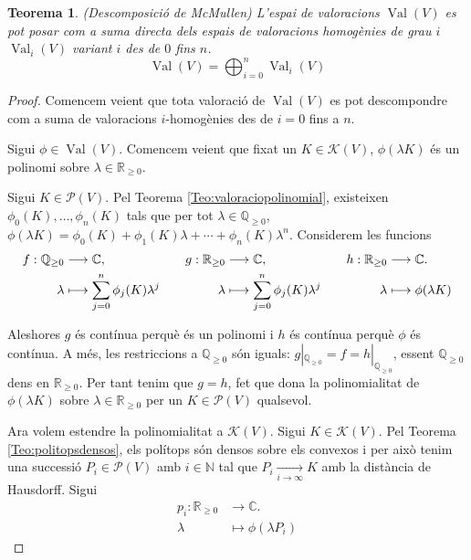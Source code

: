 \documentclass{article}
\newtheorem{teorema}{Teorema}
\theoremstyle{definition}
\DeclareMathOperator{\Val}{Val}
\begin{document}
\begin{teorema}
(Descomposici\'{o} de McMullen) L'espai de valoracions $\Val(V)$ es pot posar com a suma directa dels espais de valoracions homog\`{e}nies de grau $i$ $\Val_i(V)$ variant $i$ des de $0$ fins $n$.
\[\Val(V)=\bigoplus_{i=0}^n\Val_i(V)\]
\end{teorema}
\begin{proof}

Comencem veient que tota valoraci\'{o} de $\Val(V)$ es pot descompondre com a suma de valoracions $i$-homog\`{e}nies des de $i=0$ fins a $n$.

Sigui $\phi\in\Val(V)$. Comencem veient que fixat un $K\in\mathcal{K}(V)$, $\phi(\lambda K)$ \'{e}s un polinomi sobre $\lambda\in\mathbb{R}_{\geq0}$.

Sigui $K\in\mathcal{P}(V)$. Pel Teorema \ref{Teo:valoraciopolinomial}, existeixen $\phi_0(K),\ldots,\phi_n(K)$ tals que per tot $\lambda\in\mathbb{Q}_{\geq0}$, $\phi(\lambda K)=\phi_0(K)+\phi_1(K)\lambda+\cdots+\phi_n(K)\lambda^n$. Considerem les funcions
\[
\begin{split}
f:\mathbb{Q}_{\geq0}&\longrightarrow\mathbb{C},\\
\lambda&\longmapsto\sum_{j=0}^n\phi_j(K)\lambda^j\end{split}\hspace{7mm}\begin{split}g:\mathbb{R}_{\geq0}&\longrightarrow\mathbb{C},\\
\lambda&\longmapsto\sum_{j=0}^n\phi_j(K)\lambda^j\end{split}\hspace{7mm}\begin{split}h:\mathbb{R}_{\geq0}&\longrightarrow\mathbb{C}.\\
\lambda&\longmapsto\vphantom{\sum_{j=0}^n}\phi(\lambda K)
\end{split}
\]

Aleshores $g$ \'{e}s cont\'{i}nua perqu\`{e} \'{e}s un polinomi i $h$ \'{e}s cont\'{i}nua perqu\`{e} $\phi$ \'{e}s cont\'{i}nua. A m\'{e}s, les restriccions a $\mathbb{Q}_{\geq0}$ s\'{o}n iguals: $g|_{\mathbb{Q}_{\geq0}}=f=h|_{\mathbb{Q}_{\geq0}}$, essent $\mathbb{Q}_{\geq0}$ dens en $\mathbb{R}_{\geq0}$. Per tant tenim que $g=h$, fet que dona la polinomialitat de $\phi(\lambda K)$ sobre $\lambda\in\mathbb{R}_{\geq0}$ per un $K\in\mathcal{P}(V)$ qualsevol.

Ara volem estendre la polinomialitat a $\mathcal{K}(V)$. Sigui $K\in\mathcal{K}(V)$. Pel Teorema \ref{Teo:politopsdensos}, els pol\'{i}tops s\'{o}n densos sobre els convexos i per aix\`{o} tenim una successi\'{o} $P_i\in\mathcal{P}(V)$ amb $i\in\mathbb{N}$ tal que $P_i\xrightarrow[i\to\infty]{}K$ amb la dist\`{a}ncia de Hausdorff. Sigui
\begin{align*}
p_i:\mathbb{R}_{\geq0}&\longrightarrow\mathbb{C}.\\
\lambda&\longmapsto\phi(\lambda P_i)
\end{align*}


\end{proof}
\end{document}
